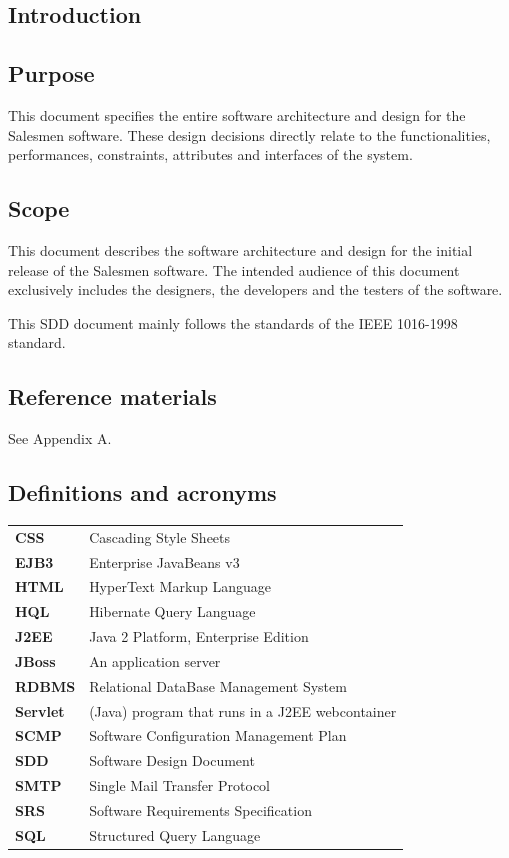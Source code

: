 \documentclass[salesmen, twoside]{../../../templates/latex/2009/softproj}
\begin{document}
\begin{projdoc}

\chapter{Introduction}

\section{Purpose}
   This document specifies the entire software architecture and design for the Salesmen software. These design decisions directly relate to the functionalities, performances, constraints, attributes and interfaces of the system.

\section{Scope}
    This document describes the software architecture and design for the initial release of the Salesmen software. The intended audience of this document exclusively includes the designers, the developers and the testers of the software.

This SDD document mainly follows the standards of the IEEE 1016-1998 standard.

\section{Reference materials}
See Appendix A.

\section{Definitions and acronyms \label{acronyms}}
\begin{tabular}{ll}
\textbf{CSS}   & Cascading Style Sheets \\
\textbf{EJB3}   & Enterprise JavaBeans v3 \\
\textbf{HTML}   & HyperText Markup Language \\
\textbf{HQL}   & Hibernate Query Language \\
\textbf{J2EE}   & Java 2 Platform, Enterprise Edition \\
\textbf{JBoss}   & An application server \\
\textbf{RDBMS}    & Relational DataBase Management System \\
\textbf{Servlet}   & (Java) program that runs in a J2EE webcontainer  \\
\textbf{SCMP}   & Software Configuration Management Plan \\
\textbf{SDD}    & Software Design Document \\
\textbf{SMTP}   & Single Mail Transfer Protocol \\
\textbf{SRS}    & Software Requirements Specification \\
\textbf{SQL}   & Structured Query Language \\
\end{tabular}


\end{projdoc}
\end{document}

